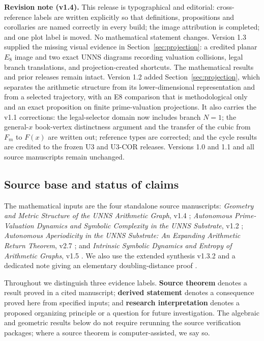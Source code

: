 \documentclass[11pt,a4paper]{article}
\theoremstyle{definition}\newtheorem{definition}[theorem]{Definition}
\begin{document}
\begin{scopebox}
\textbf{Revision note (v1.4).} This release is typographical and editorial: cross-reference labels are written explicitly so that definitions, propositions and corollaries are named correctly in every build; the image attribution is completed; and one plot label is moved. No mathematical statement changes. Version 1.3 supplied the missing visual evidence in Section~\ref{sec:projection}: a credited planar $E_8$ image and two exact UNNS diagrams recording valuation collisions, legal branch translations, and projection-created shortcuts. The mathematical results and prior releases remain intact. Version 1.2 added Section~\ref{sec:projection}, which separates the arithmetic structure from its lower-dimensional representation and from a selected trajectory, with an E8 comparison that is methodological only and an exact proposition on finite prime-valuation projections. It also carries the v1.1 corrections: the legal-selector domain now includes branch $N=1$; the general-$x$ book-vertex distinctness argument and the transfer of the cubic from $F_m$ to $F(x)$ are written out; reference types are corrected; and the cycle results are credited to the frozen U3 and U3-COR releases. Versions 1.0 and 1.1 and all source manuscripts remain unchanged.
\end{scopebox}

\subsection{Source base and status of claims}
The mathematical inputs are the four standalone source manuscripts: \emph{Geometry and Metric Structure of the UNNS Arithmetic Graph}, v1.4 \cite{geometry}; \emph{Autonomous Prime-Valuation Dynamics and Symbolic Complexity in the UNNS Substrate}, v1.2 \cite{prime}; \emph{Autonomous Aperiodicity in the UNNS Substrate: An Expanding Arithmetic Return Theorem}, v2.7 \cite{adj}; and \emph{Intrinsic Symbolic Dynamics and Entropy of Arithmetic Graphs}, v1.5 \cite{entropy}. We also use the extended synthesis v1.3.2 \cite{synthesis} and a dedicated note giving an elementary doubling-distance proof \cite{doublingnote}.

Throughout we distinguish three evidence labels. \textbf{Source theorem} denotes a result proved in a cited manuscript; \textbf{derived statement} denotes a consequence proved here from specified inputs; and \textbf{research interpretation} denotes a proposed organizing principle or a question for future investigation. The algebraic and geometric results below do not require rerunning the source verification packages; where a source theorem is computer-assisted, we say so.
\end{document}
